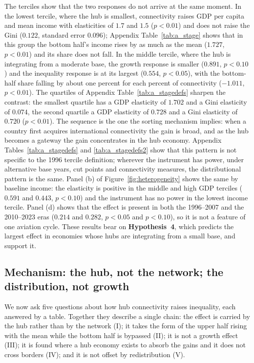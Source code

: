 The terciles show that the two responses do not arrive at the same moment. In the lowest tercile, where the hub is smallest, connectivity raises GDP per capita and mean income with elasticities of $1.7$ and $1.5$ ($p<0.01$) and does not raise the Gini ($0.122$, standard error $0.096$); Appendix Table~\ref{tab:a_stage} shows that in this group the bottom half's income rises by as much as the mean ($1.727$, $p<0.01$) and its share does not fall. In the middle tercile, where the hub is integrating from a moderate base, the growth response is smaller ($0.891$, $p<0.10$) and the inequality response is at its largest ($0.554$, $p<0.05$), with the bottom-half share falling by about one percent for each percent of connectivity ($-1.011$, $p<0.01$). The quartiles of Appendix Table~\ref{tab:a_stagedefs} sharpen the contrast: the smallest quartile has a GDP elasticity of $1.702$ and a Gini elasticity of $0.074$, the second quartile a GDP elasticity of $0.728$ and a Gini elasticity of $0.720$ ($p<0.01$). The sequence is the one the sorting mechanism implies: when a country first acquires international connectivity the gain is broad, and as the hub becomes a gateway the gain concentrates in the hub economy. Appendix Tables~\ref{tab:a_stagedefs} and \ref{tab:a_stagedefs2} show that this pattern is not specific to the 1996 tercile definition; wherever the instrument has power, under alternative base years, cut points and connectivity measures, the distributional pattern is the same. Panel (b) of Figure~\ref{fig:heterogeneity} shows the same by baseline income: the elasticity is positive in the middle and high GDP terciles ($0.591$ and $0.443$, $p<0.10$) and the instrument has no power in the lowest income tercile. Panel (d) shows that the effect is present in both the 1996--2007 and the 2010--2023 eras ($0.214$ and $0.282$, $p<0.05$ and $p<0.10$), so it is not a feature of one aviation cycle. These results bear on \textbf{Hypothesis~4}, which predicts the largest effect in economies whose hubs are integrating from a small base, and support it.

\subsection{Mechanism: the hub, not the network; the distribution, not growth}
\label{sec:mechanism}
We now ask five questions about how hub connectivity raises inequality, each answered by a table. Together they describe a single chain: the effect is carried by the hub rather than by the network (I); it takes the form of the upper half rising with the mean while the bottom half is bypassed (II); it is not a growth effect (III); it is found where a hub economy exists to absorb the gains and it does not cross borders (IV); and it is not offset by redistribution (V).

